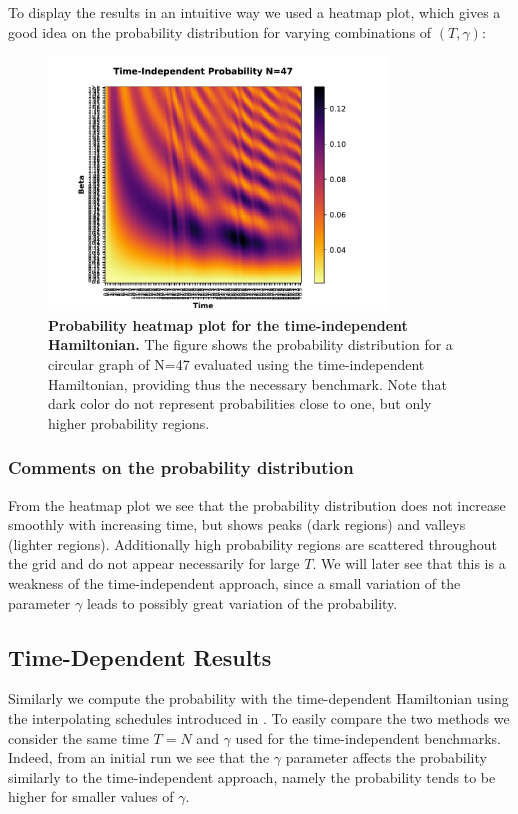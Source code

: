         To display the results in an intuitive way we used a heatmap plot, which gives a good idea on the probability distribution for varying combinations of $(T,\gamma)$: \\
          \begin{figure}[ht]
            \centering
            \includegraphics[width=9cm]{./figures/time_independent_benchmark_47}%
            \caption[Probability heatmap plot for the time-independent Hamiltonian, N=47]{\textbf{Probability heatmap plot for the time-independent Hamiltonian.} The figure shows the probability distribution for a circular graph of N=47 evaluated using the time-independent Hamiltonian, providing thus the necessary benchmark. Note that dark color do not represent probabilities close to one, but only higher probability regions.}
            \label{fig:heamap-independent}
          \end{figure}

        \subsubsection*{Comments on the probability distribution}
        From the heatmap plot we see that the probability distribution does not increase smoothly with increasing time, but shows peaks (dark regions) and valleys (lighter regions). Additionally high probability regions are scattered throughout the grid and do not appear necessarily for large $T$. We will later see that this is a weakness of the time-independent approach, since a small variation of the parameter $\gamma$ leads to possibly great variation of the probability.

    \subsection{Time-Dependent Results}
        Similarly we compute the probability with the time-dependent Hamiltonian using the interpolating schedules introduced in . To easily compare the two methods we consider the same time $T=N$ and $\gamma$ used for the time-independent benchmarks. Indeed, from an initial run we see that the $\gamma$ parameter affects the probability similarly to the time-independent approach, namely the probability tends to be higher for smaller values of $\gamma$. \\

